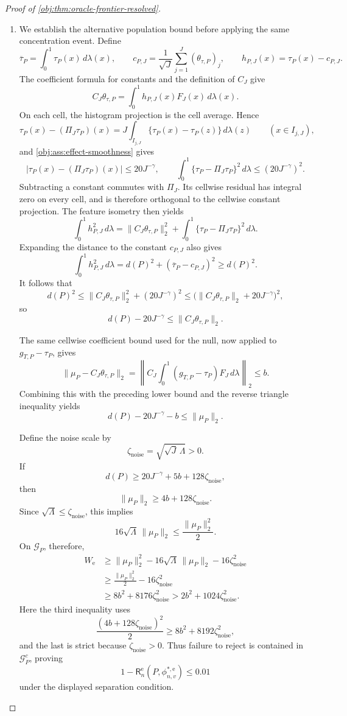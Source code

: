 \documentclass[11pt]{article}
\begin{document}
\begin{proof}[Proof of \cref{obj:thm:oracle-frontier-resolved}]
\begin{enumerate}
\item We establish the alternative population bound before applying the same concentration event. Define
\[
\overline\tau_P=\int_0^1\tau_P(x)\,d\lambda(x),
\qquad
c_{P,J}=\frac1{\sqrt J}\sum_{j=1}^{J}(\theta_{\tau,P})_j,
\qquad
h_{P,J}(x)=\tau_P(x)-c_{P,J}.
\]
The coefficient formula for constants and the definition of \(C_J\) give
\[
C_J\theta_{\tau,P}
=\int_0^1h_{P,J}(x)F_J(x)\,d\lambda(x).
\]
On each cell, the histogram projection is the cell average. Hence
\[
\tau_P(x)-(\Pi_J\tau_P)(x)
=J\int_{I_{j,J}}\{\tau_P(x)-\tau_P(z)\}\,d\lambda(z)
\qquad(x\in I_{j,J}),
\]
and \cref{obj:ass:effect-smoothness} gives
\[
|\tau_P(x)-(\Pi_J\tau_P)(x)|\le20J^{-\gamma},
\qquad
\int_0^1\{\tau_P-\Pi_J\tau_P\}^2\,d\lambda
\le(20J^{-\gamma})^2.
\]
Subtracting a constant commutes with \(\Pi_J\). Its cellwise residual has integral zero on every cell, and is therefore orthogonal to the cellwise constant projection. The feature isometry then yields
\[
\int_0^1h_{P,J}^2\,d\lambda
=
\|C_J\theta_{\tau,P}\|_2^2
+\int_0^1\{\tau_P-\Pi_J\tau_P\}^2\,d\lambda.
\]
Expanding the distance to the constant \(c_{P,J}\) also gives
\[
\int_0^1h_{P,J}^2\,d\lambda
=d(P)^2+(\overline\tau_P-c_{P,J})^2
\ge d(P)^2.
\]
It follows that
\[
d(P)^2
\le\|C_J\theta_{\tau,P}\|_2^2+(20J^{-\gamma})^2
\le\bigl(\|C_J\theta_{\tau,P}\|_2+20J^{-\gamma}\bigr)^2,
\]
so
\[
d(P)-20J^{-\gamma}\le\|C_J\theta_{\tau,P}\|_2.
\]

The same cellwise coefficient bound used for the null, now applied to \(g_{T,P}-\tau_P\), gives
\[
\|\mu_P-C_J\theta_{\tau,P}\|_2
=
\left\|C_J\int_0^1(g_{T,P}-\tau_P)F_J\,d\lambda\right\|_2
\le b.
\]
Combining this with the preceding lower bound and the reverse triangle inequality yields
\[
d(P)-20J^{-\gamma}-b\le\|\mu_P\|_2.
\]

Define the noise scale by
\[
\zeta_{\mathrm{noise}}=\sqrt{\sqrt J\,\Lambda}>0.
\]
If
\[
d(P)\ge20J^{-\gamma}+5b+128\zeta_{\mathrm{noise}},
\]
then
\[
\|\mu_P\|_2\ge4b+128\zeta_{\mathrm{noise}}.
\]
Since \(\sqrt\Lambda\le\zeta_{\mathrm{noise}}\), this implies
\[
16\sqrt\Lambda\,\|\mu_P\|_2\le\frac{\|\mu_P\|_2^2}{2}.
\]
On \(\mathcal G_P\), therefore,
\[
\begin{aligned}
W_{\mathrm e}
&\ge\|\mu_P\|_2^2
-16\sqrt\Lambda\,\|\mu_P\|_2
-16\zeta_{\mathrm{noise}}^2\\
&\ge\frac{\|\mu_P\|_2^2}{2}-16\zeta_{\mathrm{noise}}^2\\
&\ge8b^2+8176\zeta_{\mathrm{noise}}^2
>2b^2+1024\zeta_{\mathrm{noise}}^2.
\end{aligned}
\]
Here the third inequality uses
\[
\frac{(4b+128\zeta_{\mathrm{noise}})^2}{2}
\ge8b^2+8192\zeta_{\mathrm{noise}}^2,
\]
and the last is strict because \(\zeta_{\mathrm{noise}}>0\).
Thus failure to reject is contained in \(\mathcal G_P^c\), proving
\[
1-\mathsf R_n^{\mathrm e}(P,\phi^{*,\mathrm e}_{n,v})\le0.01
\]
under the displayed separation condition.


\end{enumerate}
\end{proof}
\end{document}
